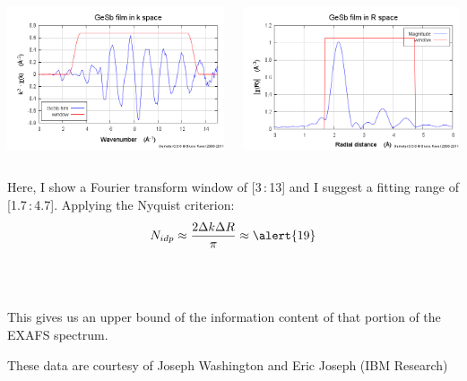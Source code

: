 \documentclass[10pt, xcolor=x11names, compress]{beamer}
\begin{document}
\begin{frame}
  \begin{columns}
    \begin{column}{0.5\linewidth}
      \begin{center}
        \includegraphics[width=0.8\linewidth]{info/gesb_chik.png}
      \end{center}
    \end{column}
    \begin{column}{0.5\linewidth}
      \begin{center}
        \includegraphics[width=0.8\linewidth]{info/gesb_chir.png}
      \end{center}
    \end{column}
  \end{columns}
  Here, I show a Fourier transform window of [3\,:\,13] and I suggest a
  fitting range of [1.7\,:\,4.7].  Applying the Nyquist criterion:
  \begin{equation}
    \notag N_{idp} \approx \frac{2\Delta k\Delta R}{\pi} \approx \alert{19}
  \end{equation}

  ~\\[-7ex]
  ~

  \begin{exampleblock}{}
    \begin{center}
      This gives us an upper bound of the information content of that
      portion of the EXAFS spectrum.
    \end{center}
  \end{exampleblock}
  \begin{bottomnote}[0.4][19.25]%
    These data are courtesy of Joseph Washington and Eric
    Joseph (IBM Research)
  \end{bottomnote}
\end{frame}
\end{document}
